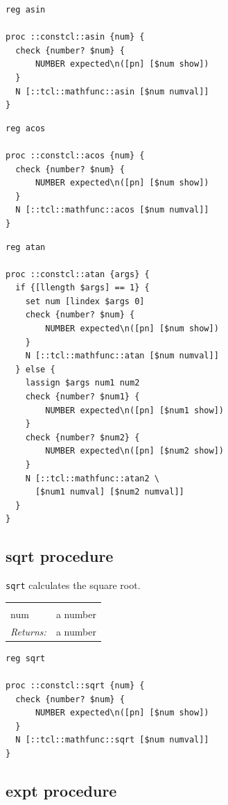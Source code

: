 \documentclass[twoside,9pt]{report}
\begin{document}
\begin{lstlisting}
reg asin
 
proc ::constcl::asin {num} {
  check {number? $num} {
      NUMBER expected\n([pn] [$num show])
  }
  N [::tcl::mathfunc::asin [$num numval]]
}
\end{lstlisting}
\begin{lstlisting}
reg acos
 
proc ::constcl::acos {num} {
  check {number? $num} {
      NUMBER expected\n([pn] [$num show])
  }
  N [::tcl::mathfunc::acos [$num numval]]
}
\end{lstlisting}
\begin{lstlisting}
reg atan
 
proc ::constcl::atan {args} {
  if {[llength $args] == 1} {
    set num [lindex $args 0]
    check {number? $num} {
        NUMBER expected\n([pn] [$num show])
    }
    N [::tcl::mathfunc::atan [$num numval]]
  } else {
    lassign $args num1 num2
    check {number? $num1} {
        NUMBER expected\n([pn] [$num1 show])
    }
    check {number? $num2} {
        NUMBER expected\n([pn] [$num2 show])
    }
    N [::tcl::mathfunc::atan2 \
      [$num1 numval] [$num2 numval]]
  }
}
\end{lstlisting}
\subsection{sqrt procedure}
\label{sqrt-procedure}


\texttt{sqrt} calculates the square root.

\noindent\begin{tabular}{ |p{1.5cm} p{8cm}| }
\hline
\rowcolor[HTML]{CCCCCC} \multicolumn{2}{|l|}{\bf sqrt (public)} \\
num & a number \\
\textit{Returns:} & a number \\
\hline
\end{tabular}
\begin{lstlisting}
reg sqrt
 
proc ::constcl::sqrt {num} {
  check {number? $num} {
      NUMBER expected\n([pn] [$num show])
  }
  N [::tcl::mathfunc::sqrt [$num numval]]
}
\end{lstlisting}
\subsection{expt procedure}
\label{expt-procedure}
\end{document}

